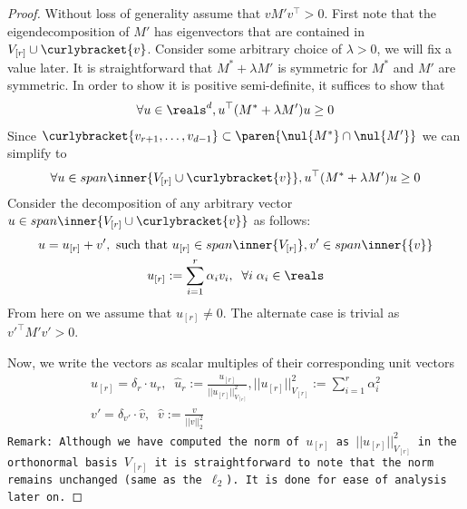 \begin{proof}
     
     Without loss of generality assume that $vM'v^{\top} > 0$. First note that the eigendecomposition of $M'$ has eigenvectors that are contained in $V_{[r]} \cup \curlybracket{v}$. Consider some arbitrary choice of $\lambda > 0$, we will fix a value later. It is straightforward that $M^* + \lambda M'$ is symmetric for $M^*$ and $M'$ are symmetric. In order to show it is positive semi-definite, it suffices to show that
     \begin{align}
         \forall u \in \reals^d, u^{\top}(M^* + \lambda M') u \ge 0 \label{eq: psd}
     \end{align}
    Since  $\curlybracket{v_{r+1},\ldots, v_{d-1}} \subset \paren{\nul{M^*} \cap \nul{M'}}$ we can simplify  to
    \begin{align}
        \forall u \in span\inner{V_{[r]} \cup \curlybracket{v}}, u^{\top}(M^* + \lambda M') u \ge 0 \label{eq: repsd}
    \end{align}
    Consider the decomposition of any arbitrary vector $u \in span\inner{V_{[r]} \cup \curlybracket{v}}$ as follows:
    \begin{gather}
        u = u_{[r]} + v', \textnormal{ such that } u_{[r]} \in span\inner{V_{[r]}}, v' \in span \inner{\{v\}} \label{eq: decom1}\\
        u_{[r]} := \sum_{i =1}^r \alpha_i v_i,\;\; \forall i\; \alpha_i \in \reals \label{eq: decom2}
    \end{gather}
    From here on we assume that $u_{[r]} \neq 0$. The alternate case is trivial as $v'^{\top}M'v' > 0$.
    
    Now, we write the vectors as scalar multiples of their corresponding unit vectors
    \begin{gather}
        u_{[r]} = \delta_r \cdot \hat{u}_r,\;\; \hat{u}_r := \frac{u_{[r]}}{||u_{[r]}||^2_{V_{[r]}}}, ||u_{[r]}||^2_{V_{[r]}} := \sum_{i =1}^r \alpha_i^2 \label{eq: scale1}\\
        v' = \delta_{v'}\cdot \hat{v},\;\; \hat{v} := \frac{v}{||v||_2^2} \label{eq: scale2}
    \end{gather}
    \tt{Remark}: Although we have computed the norm of $ u_{[r]}$  as $||u_{[r]}||^2_{V_{[r]}}$ in the orthonormal basis $V_{[r]}$ it is straightforward to note that the norm remains unchanged (same as the $\ell_2$). It is done for ease of analysis later on.
    

\end{proof}
